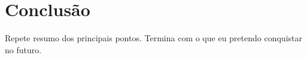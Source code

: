 \documentclass[11pt,a4paper,oneside]{book}
\begin{document}
\chapter{Conclusão}

Repete resumo dos principais pontos.
Termina com o que eu pretendo conquistar no futuro.

\backmatter

\end{document}
